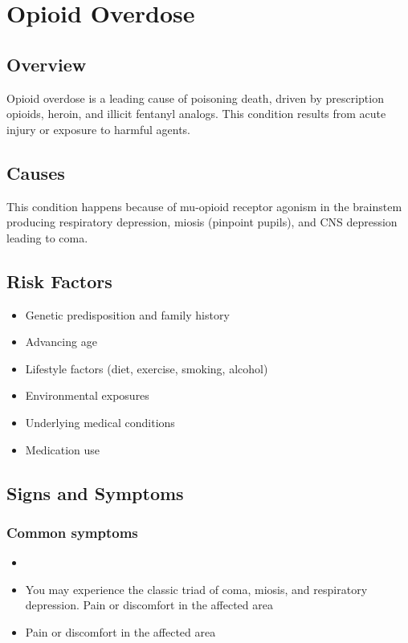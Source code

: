 \chapter{Opioid Overdose}
\label{sec:Opioid Overdose}

\section{Overview}
Opioid overdose is a leading cause of poisoning death, driven by prescription opioids, heroin, and illicit fentanyl analogs. This condition results from acute injury or exposure to harmful agents.
\section{Causes}
This condition happens because of mu-opioid receptor agonism in the brainstem producing respiratory depression, miosis (pinpoint pupils), and CNS depression leading to coma.     
\section{Risk Factors}

\begin{itemize}[noitemsep]
  \item Genetic predisposition and family history
  \item Advancing age
  \item Lifestyle factors (diet, exercise, smoking, alcohol)
  \item Environmental exposures
  \item Underlying medical conditions
  \item Medication use
\end{itemize}
\section{Signs and Symptoms}

\subsection{Common symptoms}
\begin{itemize}[noitemsep]
  \item \item You may experience the classic triad of coma, miosis, and respiratory depression. Pain or discomfort in the affected area    \item Pain or discomfort in the affected area
  \end{itemize}


